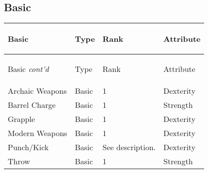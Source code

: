 \documentclass[twoside]{book}
\begin{document}
    

\subsection{Basic}
    
\begin{longtable}{p{1.25in}lll} 
  Basic& \begin{turn}{70}{Type}\end{turn}
          & \begin{turn}{70}{Rank}\end{turn}
          & \begin{turn}{70}{Attribute}\end{turn}
          \\
  \hline
  \hline
  \endfirsthead
  Basic \textit{cont'd}
        & \begin{turn}{70}{Type}\end{turn}
          & \begin{turn}{70}{Rank}\end{turn}
          & \begin{turn}{70}{Attribute}\end{turn}
           \\
  \hline
  \endhead
\raggedright Archaic Weapons&Basic&1&Dexterity\tabularnewline
      \raggedright Barrel Charge&Basic&1&Strength\tabularnewline
      \raggedright Grapple&Basic&1&Dexterity\tabularnewline
      \raggedright Modern Weapons&Basic&1&Dexterity\tabularnewline
      \raggedright Punch/Kick&Basic&See description.&Dexterity\tabularnewline
      \raggedright Throw&Basic&1&Strength\tabularnewline
      
\end{longtable}
    
\end{document}
